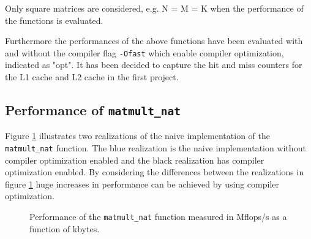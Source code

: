 Only square matrices are considered, e.g. N = M = K when the performance of the functions is evaluated. 

Furthermore the performances of the above functions have been evaluated with and without the compiler flag \texttt{-Ofast} which enable compiler optimization, indicated as "opt".
It has been decided to capture the hit and miss counters for the L1 cache and L2 cache in the first project.

\subsection{Performance of \texttt{matmult\_nat}}

Figure \ref{fig:nat_perf} illustrates two realizations of the naive implementation of the \texttt{matmult\_nat} function. The blue realization is the naive implementation without compiler optimization enabled and the black realization has compiler optimization enabled. By considering the differences between the realizations in figure \ref{fig:nat_perf} huge increases in performance can be achieved by using compiler optimization.\\

\begin{figure}[!th]
\centering
{}
\caption{Performance of the \texttt{matmult\_nat} function measured in Mflops/s as a function of kbytes.}
\label{fig:nat_perf}
\end{figure}


